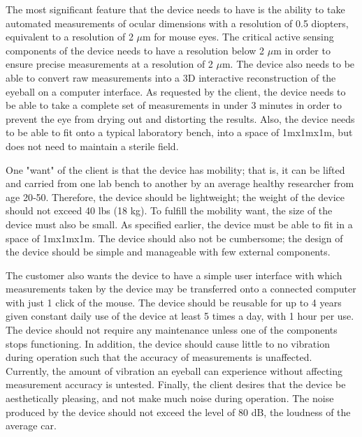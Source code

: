 \documentclass{article}
\begin{document}
The most significant feature that the device needs to have is the ability to take automated measurements of ocular dimensions with a resolution of 0.5 diopters, equivalent to a resolution of 2 $\mu$m for mouse eyes. The critical active sensing components of the device needs to have a resolution below 2 $\mu$m in order to ensure precise measurements at a resolution of 2 $\mu$m. The device also needs to be able to convert raw measurements into a 3D interactive reconstruction of the eyeball on a computer interface. As requested by the client, the device needs to be able to take a complete set of measurements in under 3 minutes in order to prevent the eye from drying out and distorting the results. Also, the device needs to be able to fit onto a typical laboratory bench, into a space of 1mx1mx1m, but does not need to maintain a sterile field.      

One "want" of the client is that the device has mobility; that is, it can be lifted and carried from one lab bench to another by an average healthy researcher from age 20‐50. Therefore, the device should be lightweight; the weight of the device should not exceed 40 lbs (18 kg)\cite{gross03}. To fulfill the mobility want, the size of the device must also be small. As specified earlier, the device must be able to fit in a space of 1mx1mx1m. The device should also not be cumbersome; the design of the device should be simple and manageable with few external components.

The customer also wants the device to have a simple user interface with which measurements taken by the device may be transferred onto a connected computer with just 1 click of the mouse. The device should  be reusable for up to 4 years given constant daily use of the device at least 5 times a day, with 1 hour per use\cite{keyence01}. The device should not require any maintenance unless one of the components stops functioning\cite{keyence01}. In addition, the device should cause little to no vibration during operation such that the accuracy of measurements is unaffected. Currently, the amount of vibration an eyeball can experience without affecting measurement accuracy is untested. Finally, the client desires that the device be aesthetically pleasing, and not make much noise during operation. The noise produced by the device should not exceed the level of 80 dB, the loudness of the average car\cite{truax09}.  
\end{document}
